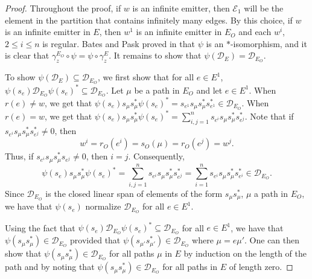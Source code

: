 \documentclass[12pt]{amsbook}%
\theoremstyle{defin}
\theoremstyle{remark}
\numberwithin{equation}{chapter}
\numberwithin{theor}{section}
\begin{document}
\begin{proof}
Throughout the proof, if $w$ is an infinite emitter, then $\mathcal{E}_1$ will be the element in the partition that contains infinitely many edges.  By this choice, if $w$ is an infinite emitter in $E$, then $w^1$ is an infinite emitter in $E_O$ and each $w^i$, $2 \leq i \leq n$ is regular.  Bates and Pask proved in \cite[Theorem~3.2]{tbdp:fega} that $\psi$ is an $*$-isomorphism, and   it is clear that $\gamma_z^{E_{O}} \circ \psi = \psi \circ \gamma_z^E$.  It remains to show that $\psi ( \mathcal{D}_E ) =  \mathcal{D}_{E_{O}}$.

To show $\psi ( \mathcal{D}_E ) \subseteq  \mathcal{D}_{E_{O}}$, we first show that for all $e \in E^1$, $\psi ( s_e) \mathcal{D}_{E_O} \psi ( s_e)^* \subseteq \mathcal{D}_{E_O}$.  Let $\mu$ be a path in $E_O$ and let $e \in E^1$.  When $r (e) \neq w$, we get that $\psi ( s_e ) s_{\mu} s_\mu^* \psi ( s_e )^*= s_{ e^1} s_{\mu} s_{\mu}^* s_{e^1}^* \in \mathcal{D}_{E_O}$.  When $r(e) = w$, we get that $\psi ( s_e ) s_{\mu} s_\mu^* \psi ( s_e )^* = \sum_{ i, j = 1}^n s_{e^i } s_{\mu} s_{\mu}^* s_{e^j }^*$.  Note that if $s_{e^i} s_\mu s_\mu^* s_{e^j}^* \neq 0$, then 
\[
w^i = r_{O}(e^i) = s_{O}(\mu)=r_{O}(e^j) = w^j.
\] 
Thus, if $s_{e^i} s_\mu s_\mu^* s_{e^j} \neq 0$, then $i=j$.  Consequently,
\[
\psi ( s_e ) s_{\mu} s_\mu^* \psi ( s_e )^* = \sum_{ i, j = 1}^n s_{e^i } s_{\mu} s_{\mu}^* s_{e^j }^* =   \sum_{ i= 1}^n s_{e^i } s_{\mu} s_{\mu}^* s_{e^i }^* \in \mathcal{D}_{E_O}.
\]
Since $\mathcal{D}_{E_O}$ is the closed linear span of elements of the form $s_\mu s_\mu^*$, $\mu$ a path in $E_O$, we have that $\psi ( s_e)$ normalize $\mathcal{D}_{E_O}$ for all $e \in E^1$.

Using the fact that $\psi ( s_e) \mathcal{D}_{E_O} \psi ( s_e)^* \subseteq \mathcal{D}_{E_O}$ for all $e \in E^1$, we have that $\psi ( s_\mu s_\mu^* ) \in \mathcal{D}_{E_O}$ provided that $\psi ( s_{\mu'} s_{\mu'}^* ) \in \mathcal{D}_{E_O}$ where $\mu = e \mu'$.  One can then show that $\psi ( s_\mu s_\mu^* ) \in \mathcal{D}_{E_O}$ for all paths $\mu$ in $E$ by induction on the length of the path and by noting that $\psi ( s_\mu s_\mu^*) \in \mathcal{D}_{E_O}$ for all paths in $E$ of length zero. 



\end{proof}
\end{document}
